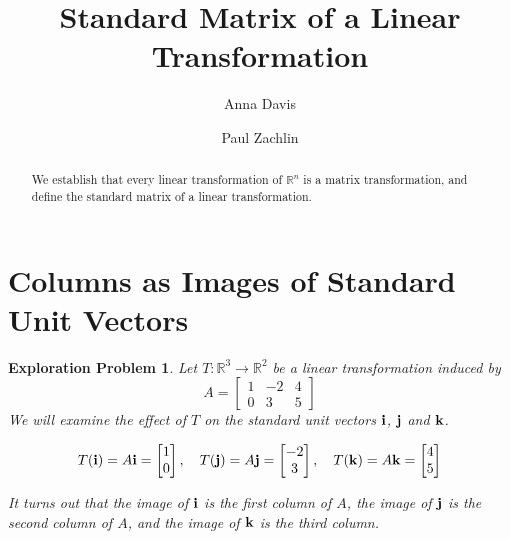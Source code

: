 \documentclass{ximera}
\author{Anna Davis \and Paul Zachlin} \title{Standard Matrix of a Linear Transformation} \license{CC-BY 4.0}
\renewcommand{\vec}[1]{{\bf #1}}
\newcommand{\RR}{\mathbb{R}}
\newtheorem{initprob}{Exploration Problem}
\begin{document}
\begin{abstract}
  We establish that every linear transformation of $\RR^n$ is a matrix transformation, and define the standard matrix of a linear transformation.
\end{abstract}
\maketitle



\section*{Columns as Images of Standard Unit Vectors}

\begin{initprob} Let $T:\RR^3\rightarrow \RR^2$ be a linear transformation induced by
$$A=\begin{bmatrix}1&-2&4\\0&3&5\end{bmatrix}$$
We will examine the effect of $T$ on the standard unit vectors $\vec{i}$, $\vec{j}$ and $\vec{k}$.

$$T(\vec{i})=A\vec{i}=\begin{bmatrix}1\\0\end{bmatrix},\quad T(\vec{j})=A\vec{j}=\begin{bmatrix}-2\\3\end{bmatrix}, \quad
T(\vec{k})=A\vec{k}=\begin{bmatrix}4\\5\end{bmatrix}$$

It turns out that the image of $\vec{i}$ is the first column of $A$, the image of $\vec{j}$ is the second column of $A$, and the image of $\vec{k}$ is the third column.
\end{initprob}
\end{document}
